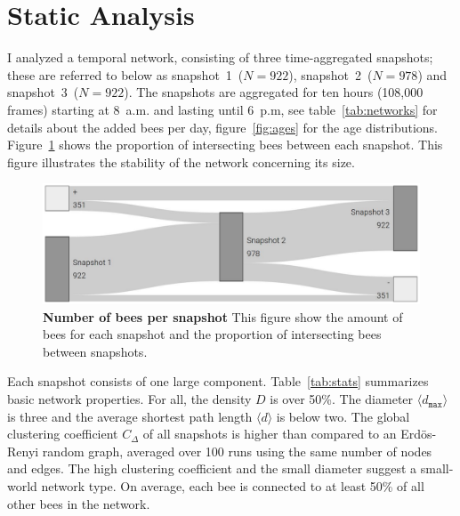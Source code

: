 \section{Static Analysis}

I analyzed a temporal network, consisting of three time-aggregated snapshots; these are referred to below as snapshot~1~($N=922$), snapshot~2~($N=978$) and snapshot~3~($N=922$). 
The snapshots are aggregated for ten hours (108,000 frames) starting at 8~a.m. and lasting until 6~p.m, see table~\ref{tab:networks} for details about the added bees per day,  figure~\ref{fig:ages} for the age distributions. Figure~\ref{fig:network-matching} shows the proportion of intersecting bees between each snapshot. This figure illustrates the stability of the network concerning its size. 



\begin{figure}[htb]
	\centering
	\includegraphics[width=.8\textwidth]{Figures/network_matching}
	\caption[Number of bees per snapshot]{\textbf{Number of bees per snapshot} This figure show the amount of bees for each snapshot and the proportion of intersecting bees between snapshots.}
	\label{fig:network-matching}
\end{figure}

Each snapshot consists of one large component.
Table~\ref{tab:stats} summarizes basic network properties.
For all, the density $D$ is over 50\%.
The diameter $\langle d_{\texttt{max}} \rangle$ is three and the average shortest path length $\langle d \rangle$ is below two.
The global clustering coefficient $C_\Delta$ of all snapshots is higher than compared to an Erdös-Renyi random graph, averaged over 100 runs using the same number of nodes and edges.
The high clustering coefficient and the small diameter suggest a small-world network type.
On average, each bee is connected to at least 50\% of all other bees in the network.

